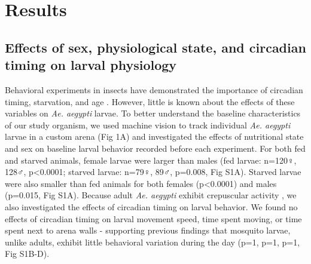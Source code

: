 \section*{Results}\linenumbers
\subsection*{Effects of sex, physiological state, and circadian timing on larval physiology} 
\noindent Behavioral experiments in insects have demonstrated the importance of circadian timing, starvation, and age \cite{Kaiser2008-me}. However, little is known about the effects of these variables on \textit{Ae. aegypti} larvae. To better understand the baseline characteristics of our study organism, we used machine vision to track individual \textit{Ae. aegypti} larvae in a custom arena (Fig 1A) and investigated the effects of nutritional state and sex on baseline larval behavior recorded before each experiment. For both fed and starved animals, female larvae were larger than males (fed larvae: n=120${\female}$, 128${\male}$, p<0.0001; starved larvae: n=79${\female}$, 89${\male}$, p=0.008, Fig S1A). Starved larvae were also smaller than fed animals for both females (p<0.0001) and males (p=0.015, Fig S1A). Because adult \textit{Ae. aegypti} exhibit crepuscular activity \cite{Christophers1960-xf}, we also investigated the effects of circadian timing on larval behavior. We found no effects of circadian timing on larval movement speed, time spent moving, or time spent next to arena walls - supporting previous findings that mosquito larvae, unlike adults, exhibit little behavioral variation during the day \cite{Van_Pletzen1981-qm,Clopton1979-in} (p=1, p=1, p=1, Fig S1B-D). 






